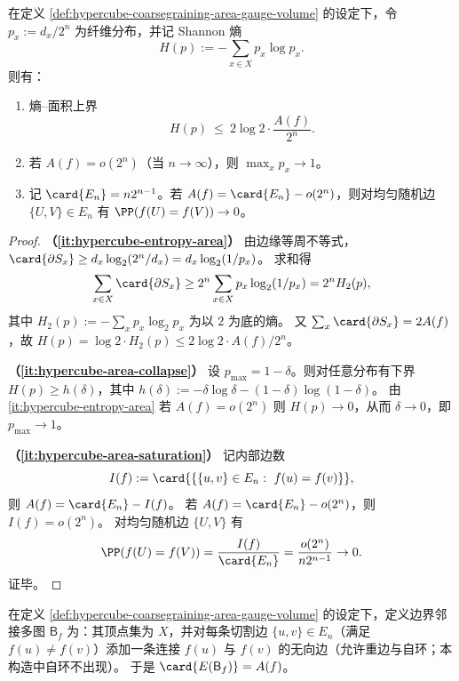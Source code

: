 

\begin{proposition}[面积律的熵上界与二相刚性]\label{prop:hypercube-entropy-area-rigidity}
在定义 \ref{def:hypercube-coarsegraining-area-gauge-volume} 的设定下，令 \(p_x:=d_x/2^n\) 为纤维分布，并记 Shannon 熵
\[
H(p):=-\sum_{x\in X}p_x\log p_x.
\]
则有：
\begin{enumerate}
  \item \label{it:hypercube-entropy-area} 熵--面积上界
  \[
  \boxed{\;
  H(p)\ \le\ 2\log 2\cdot \frac{A(f)}{2^n}.
  \;}
  \]
  \item \label{it:hypercube-area-collapse} 若 \(A(f)=o(2^n)\)（当 \(n\to\infty\)），则 \(\max_x p_x\to 1\)。
  \item \label{it:hypercube-area-saturation} 记 \(\card{E_n}=n2^{n-1}\)。若 \(A(f)=\card{E_n}-o(2^n)\)，则对均匀随机边 \(\{U,V\}\in E_n\) 有 \(\PP(f(U)=f(V))\to 0\)。
\end{enumerate}
\end{proposition}

\begin{proof}
\textbf{（\ref{it:hypercube-entropy-area}）}
由边缘等周不等式，\(\card{\partial S_x}\ge d_x\log_2(2^n/d_x)=d_x\log_2(1/p_x)\)。
求和得
\[
\sum_{x\in X}\card{\partial S_x}
\ge
2^n\sum_{x\in X}p_x\log_2(1/p_x)
=
2^n H_2(p),
\]
其中 \(H_2(p):=-\sum_x p_x\log_2 p_x\) 为以 \(2\) 为底的熵。
又 \(\sum_x\card{\partial S_x}=2A(f)\)，故 \(H(p)=\log 2\cdot H_2(p)\le 2\log 2\cdot A(f)/2^n\)。

\textbf{（\ref{it:hypercube-area-collapse}）}
设 \(p_{\max}=1-\delta\)。则对任意分布有下界 \(H(p)\ge h(\delta)\)，其中
\(
h(\delta):=-\delta\log\delta-(1-\delta)\log(1-\delta)
\)。
由 \ref{it:hypercube-entropy-area} 若 \(A(f)=o(2^n)\) 则 \(H(p)\to 0\)，从而 \(\delta\to 0\)，即 \(p_{\max}\to 1\)。

\textbf{（\ref{it:hypercube-area-saturation}）}
记内部边数
\[
I(f):=\card{\{\{u,v\}\in E_n:\ f(u)=f(v)\}},
\]
则 \(A(f)=\card{E_n}-I(f)\)。
若 \(A(f)=\card{E_n}-o(2^n)\)，则 \(I(f)=o(2^n)\)。
对均匀随机边 \(\{U,V\}\) 有
\[
\PP(f(U)=f(V))=\frac{I(f)}{\card{E_n}}=\frac{o(2^n)}{n2^{n-1}}\to 0.
\]
证毕。
\end{proof}

\begin{definition}[边界邻接多图]\label{def:hypercube-boundary-multigraph}
在定义 \ref{def:hypercube-coarsegraining-area-gauge-volume} 的设定下，定义边界邻接多图 \(\mathsf B_f\) 为：其顶点集为 \(X\)，并对每条切割边 \(\{u,v\}\in E_n\)（满足 \(f(u)\neq f(v)\)）添加一条连接 \(f(u)\) 与 \(f(v)\) 的无向边（允许重边与自环；本构造中自环不出现）。
于是 \(\card{E(\mathsf B_f)}=A(f)\)。
\end{definition}


